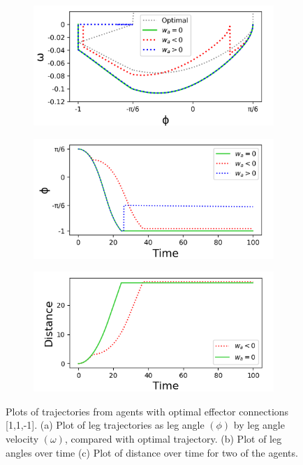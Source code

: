 \documentclass{article}
\begin{document}
\begin{figure}[htbp]
  \centering
  \begin{subfigure}[b]{0.32\textwidth}
    \centering
    \includegraphics[width=\textwidth]{../plots/trajectory1comparison.png}
    \caption{}
    \label{fig:DuckPlot1Compare}
  \end{subfigure}
  \begin{subfigure}[b]{0.32\textwidth}
    \centering
    \includegraphics[width=\textwidth]{../plots/angleTime1comparison.png}
    \caption{}
    \label{fig:angleTimePlot1Compare}
  \end{subfigure}
  \begin{subfigure}[b]{0.32\textwidth}
    \centering
    \includegraphics[width=\textwidth]{../plots/dist_compare.png}
    \caption{}
    \label{fig:distCompare}
  \end{subfigure}
  \caption{Plots of trajectories from agents with optimal effector connections [1,1,-1]. (a) Plot of leg trajectories as leg angle \((\phi)\) by leg angle velocity \((\omega)\), compared with optimal trajectory. (b) Plot of leg angles over time (c) Plot of distance over time for two of the agents.}
  \label{fig:comparePlots1}
\end{figure}
\end{document}
